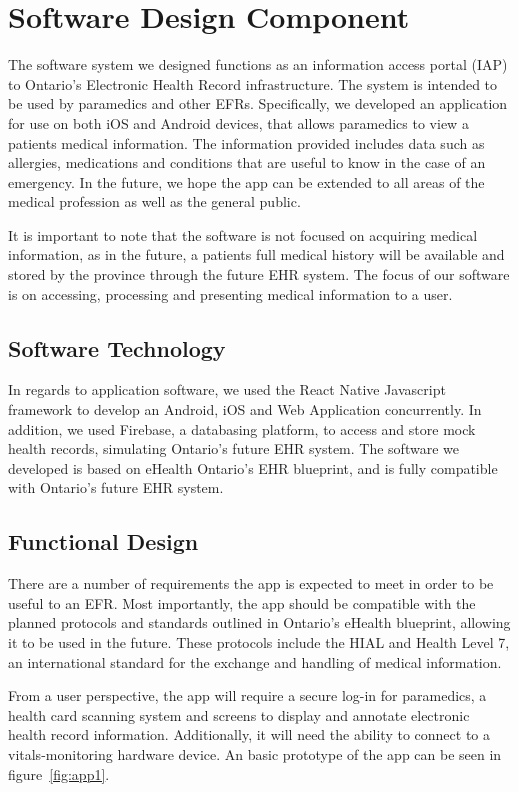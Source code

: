 
\section{Software Design Component}

The software system we designed functions as an information access portal (IAP) to Ontario's Electronic Health Record infrastructure. The system is intended to be used by paramedics and other EFRs. Specifically, we developed an application for use on both iOS and Android devices, that allows paramedics to view a patients medical information. The information provided includes data such as allergies, medications and conditions that are useful to know in the case of an emergency. In the future, we hope the app can be extended to all areas of the medical profession as well as the general public.

It is important to note that the software is not focused on acquiring medical information, as in the future, a patients full medical history will be available and stored by the province through the future EHR system. The focus of our software is on accessing, processing and presenting medical information to a user.

\subsection{Software Technology}
In regards to application software, we used the React Native Javascript framework to develop an Android, iOS and Web Application concurrently. In addition, we used Firebase, a databasing platform, to access and store mock health records, simulating Ontario's future EHR system. The software we developed is based on eHealth Ontario's EHR blueprint, and is fully compatible with Ontario's future EHR system.

\subsection{Functional Design}

There are a number of requirements the app is expected to meet in order to be useful to an EFR. Most importantly, the app should be compatible with the planned protocols and standards outlined in Ontario's eHealth blueprint, allowing it to be used in the future. These protocols include the HIAL and Health Level 7, an international standard for the exchange and handling of medical information.

From a user perspective, the app will require a secure log-in for paramedics, a health card scanning system and screens to display and annotate electronic health record information. Additionally, it will need the ability to connect to a vitals-monitoring hardware device. An basic prototype of the app can be seen in figure~\ref{fig:app1}.

